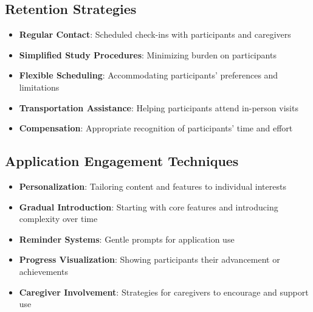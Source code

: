 \subsection{Retention Strategies}
\begin{itemize}
    \item \textbf{Regular Contact}: Scheduled check-ins with participants and caregivers
    
    \item \textbf{Simplified Study Procedures}: Minimizing burden on participants
    
    \item \textbf{Flexible Scheduling}: Accommodating participants' preferences and limitations
    
    \item \textbf{Transportation Assistance}: Helping participants attend in-person visits
    
    \item \textbf{Compensation}: Appropriate recognition of participants' time and effort
\end{itemize}

\subsection{Application Engagement Techniques}
\begin{itemize}
    \item \textbf{Personalization}: Tailoring content and features to individual interests
    
    \item \textbf{Gradual Introduction}: Starting with core features and introducing complexity over time
    
    \item \textbf{Reminder Systems}: Gentle prompts for application use
    
    \item \textbf{Progress Visualization}: Showing participants their advancement or achievements
    
    \item \textbf{Caregiver Involvement}: Strategies for caregivers to encourage and support use
\end{itemize}

